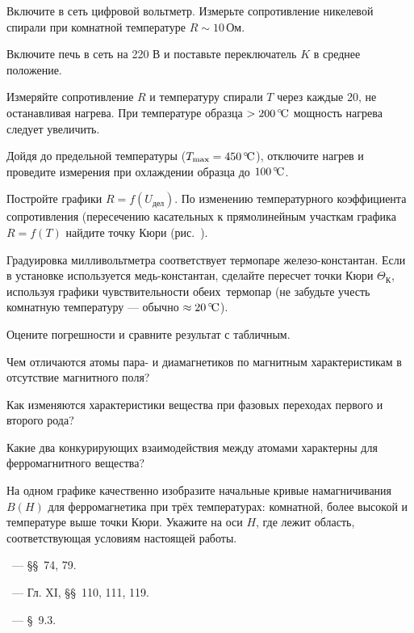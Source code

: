 \begin{lab:task}

    
\item
  Включите в сеть цифровой вольтметр. Измерьте сопротивление никелевой спирали
при комнатной температуре $R \sim 10\,\text{Ом}$.
\item
  Включите печь в сеть на 220 В и поставьте переключатель $K$ в среднее
положение.
\item
  Измеряйте сопротивление $R$ и температуру спирали $T$ через каждые 20\oC,
  не останавливая нагрева. При температуре образца $>200\,^\circ\!\mathrm{C}$ мощность
нагрева следует увеличить.

Дойдя до предельной температуры ($T_\text{max} = 450\,^\circ\!\mathrm{C}$), отключите
нагрев и проведите измерения при охлаждении образца до $100\,^\circ\!\mathrm{C}$.


\item
  Постройте графики $R = f(U_\text{дел})$. По изменению температурного
коэффициента сопротивления (пересечению касательных к прямолинейным участкам
графика $R = f(T)$ найдите точку Кюри (рис.~).
\item
  Градуировка милливольтметра соответствует термопаре железо-кон\-стантан. Если
в установке используется медь-константан, сделайте пересчет точки Кюри
$\Theta_{К}$, используя графики чувствительности \mbox{обеих тер}\-мопар (не
забудьте учесть комнатную температуру --- обычно $\approx20\,^\circ\!\mathrm{C}$).
\item
  Оцените погрешности и сравните результат с табличным.

\end{lab:task}


\begin{lab:questions}

\item
  Чем отличаются атомы пара- и диамагнетиков по магнитным характеристикам в
отсутствие магнитного поля?
\item
  Как изменяются характеристики вещества при фазовых переходах первого и
второго рода?
\item
  Какие два конкурирующих взаимодействия между атомами характерны для
ферромагнитного вещества?
\item
  На одном графике качественно изобразите начальные кривые намагничивания
$B(H)$ для ферромагнетика при трёх температурах: комнатной, более высокой и
температуре выше точки Кюри. Укажите на оси $H$, где лежит область,
соответствующая условиям настоящей работы.

\end{lab:questions}


\begin{lab:literature}
\item \SivuhinIII~--- \S\S~74, 79.
\item \Kalashnikov~--- Гл. XI, \S\S~110, 111, 119.
\item \Kirichenko~--- \S~9.3.
\end{lab:literature}

